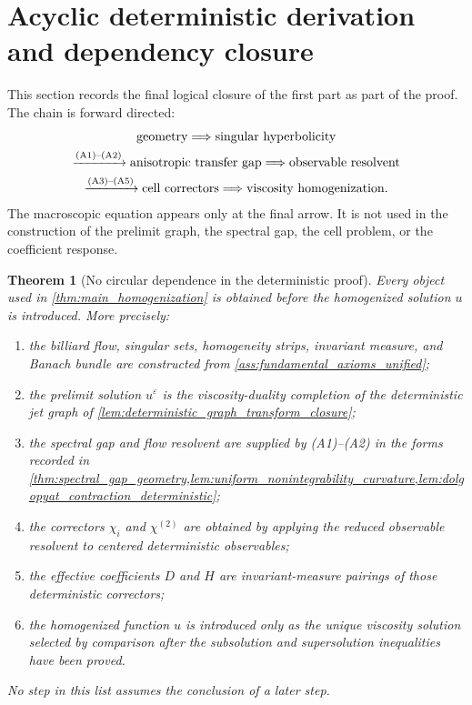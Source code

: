 \documentclass[12pt, letterpaper]{amsart}
\theoremstyle{plain}
\newtheorem{theorem}{Theorem}[section]
\theoremstyle{definition}
\theoremstyle{remark}
\begin{document}
\section{Acyclic deterministic derivation and dependency closure}
\label{sec:acyclic_deterministic_closure}

This section records the final logical closure of the first part as part of
the proof.  The chain is forward directed:
\begin{equation}
\label{eq:acyclic_chain_summary}
\begin{gathered}
\hbox{geometry}
\Longrightarrow
\hbox{singular hyperbolicity}\\
\xrightarrow{\textup{(A1)--(A2)}}
\hbox{anisotropic transfer gap}
\Longrightarrow
\hbox{observable resolvent}\\
\xrightarrow{\textup{(A3)--(A5)}}
\hbox{cell correctors}
\Longrightarrow
\hbox{viscosity homogenization}.
\end{gathered}
\end{equation}
The macroscopic equation appears only at the final arrow.  It is not used in the
construction of the prelimit graph, the spectral gap, the cell problem, or the
coefficient response.

\begin{theorem}[No circular dependence in the deterministic proof]
\label{thm:no_circular_dependence_deterministic}
Every object used in \cref{thm:main_homogenization} is obtained before the
homogenized solution $u$ is introduced.  More precisely:
\begin{enumerate}[label=(\roman*), wide, labelindent=0pt]
    \item the billiard flow, singular sets, homogeneity strips, invariant
    measure, and Banach bundle are constructed from
    \cref{ass:fundamental_axioms_unified};
    \item the prelimit solution $u^\varepsilon$ is the viscosity-duality
    completion of the deterministic jet graph of
    \cref{lem:deterministic_graph_transform_closure};
    \item the spectral gap and flow resolvent are supplied by
    \textup{(A1)--(A2)} in the forms recorded in
    \cref{thm:spectral_gap_geometry,lem:uniform_nonintegrability_curvature,lem:dolgopyat_contraction_deterministic};
    \item the correctors $\chi_i$ and $\chi^{(2)}$ are obtained by applying the
    reduced observable resolvent to centered deterministic observables;
    \item the effective coefficients $D$ and $H$ are invariant-measure pairings
    of those deterministic correctors;
    \item the homogenized function $u$ is introduced only as the unique
    viscosity solution selected by comparison after the subsolution and
    supersolution inequalities have been proved.
\end{enumerate}
No step in this list assumes the conclusion of a later step.
\end{theorem}
\end{document}
